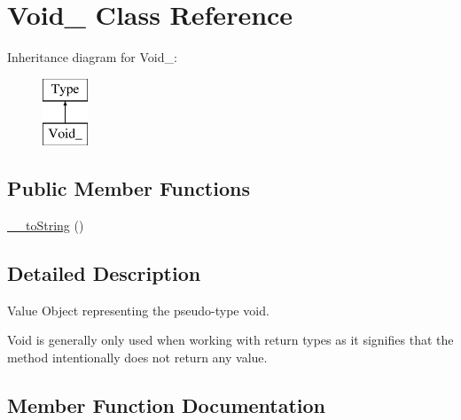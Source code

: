 \hypertarget{classphp_documentor_1_1_reflection_1_1_types_1_1_void__}{}\section{Void\+\_\+ Class Reference}
\label{classphp_documentor_1_1_reflection_1_1_types_1_1_void__}
Inheritance diagram for Void\+\_\+\+:\begin{figure}[H]
\begin{center}
\leavevmode
\includegraphics[height=2.000000cm]{classphp_documentor_1_1_reflection_1_1_types_1_1_void__}
\end{center}
\end{figure}
\subsection*{Public Member Functions}
\begin{DoxyCompactItemize}
\item 
\mbox{\hyperlink{classphp_documentor_1_1_reflection_1_1_types_1_1_void___a7516ca30af0db3cdbf9a7739b48ce91d}{\+\_\+\+\_\+to\+String}} ()
\end{DoxyCompactItemize}


\subsection{Detailed Description}
Value Object representing the pseudo-\/type \textquotesingle{}void\textquotesingle{}.

Void is generally only used when working with return types as it signifies that the method intentionally does not return any value. 

\subsection{Member Function Documentation}
\mbox{\label{classphp_documentor_1_1_reflection_1_1_types_1_1_void___a7516ca30af0db3cdbf9a7739b48ce91d}} 
